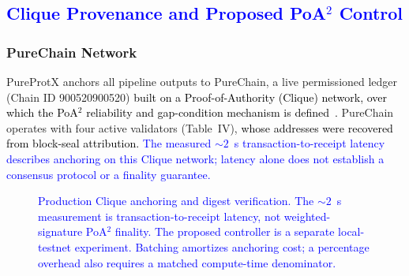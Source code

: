 \documentclass[conference]{IEEEtran}
\newcommand{\rev}[2]{\textcolor{blue}{#2}}
\begin{document}
\subsection{\textbf{\rev{R1.2, R2.4}{Clique Provenance and Proposed PoA$^2$ Control}}}
\label{sec:blockchain}

\subsubsection{PureChain Network}

PureProtX anchors all pipeline outputs to PureChain, a
live permissioned ledger (Chain ID 900520900520)
\textcolor{black}{built on a Proof-of-Authority (Clique) network, over
which the PoA$^2$ reliability and gap-condition mechanism is
defined~\cite{kim2025proof, ajakwe2025ebctc}.}
PureChain operates with four active validators (Table~IV),
\textcolor{black}{whose addresses were recovered from block-seal
attribution.} \rev{R2.4}{The measured ${\sim}2$~s transaction-to-receipt
latency describes anchoring on this Clique network; latency alone
does not establish a consensus protocol or a finality guarantee.}

\begin{figure}[!t]
\centering
{}
\caption{\rev{R1.1, R1.2, R1.3, R1.4, R2.2, R2.4}{Production
Clique anchoring and digest verification. The ${\sim}2$~s
measurement is transaction-to-receipt latency, not weighted-signature
PoA$^2$ finality. The proposed controller is a separate local-testnet
experiment. Batching amortizes anchoring cost; a percentage overhead
also requires a matched compute-time denominator.}}

\label{fig:poa-provenance}
\end{figure}
\end{document}
